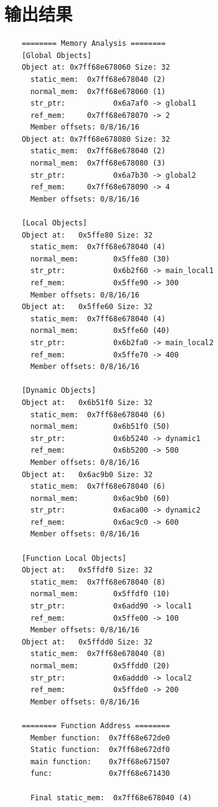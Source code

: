 \documentclass{article}
\begin{document}
\section{输出结果}
\begin{lstlisting}
    ======== Memory Analysis ========
    [Global Objects]
    Object at: 0x7ff68e678060 Size: 32
      static_mem:  0x7ff68e678040 (2)
      normal_mem:  0x7ff68e678060 (1)
      str_ptr:           0x6a7af0 -> global1
      ref_mem:     0x7ff68e678070 -> 2
      Member offsets: 0/8/16/16
    Object at: 0x7ff68e678080 Size: 32
      static_mem:  0x7ff68e678040 (2)
      normal_mem:  0x7ff68e678080 (3)
      str_ptr:           0x6a7b30 -> global2
      ref_mem:     0x7ff68e678090 -> 4
      Member offsets: 0/8/16/16
    
    [Local Objects]
    Object at:   0x5ffe80 Size: 32
      static_mem:  0x7ff68e678040 (4)
      normal_mem:        0x5ffe80 (30)
      str_ptr:           0x6b2f60 -> main_local1
      ref_mem:           0x5ffe90 -> 300
      Member offsets: 0/8/16/16
    Object at:   0x5ffe60 Size: 32
      static_mem:  0x7ff68e678040 (4)
      normal_mem:        0x5ffe60 (40)
      str_ptr:           0x6b2fa0 -> main_local2
      ref_mem:           0x5ffe70 -> 400
      Member offsets: 0/8/16/16
    
    [Dynamic Objects]
    Object at:   0x6b51f0 Size: 32
      static_mem:  0x7ff68e678040 (6)
      normal_mem:        0x6b51f0 (50)
      str_ptr:           0x6b5240 -> dynamic1
      ref_mem:           0x6b5200 -> 500
      Member offsets: 0/8/16/16
    Object at:   0x6ac9b0 Size: 32
      static_mem:  0x7ff68e678040 (6)
      normal_mem:        0x6ac9b0 (60)
      str_ptr:           0x6aca00 -> dynamic2
      ref_mem:           0x6ac9c0 -> 600
      Member offsets: 0/8/16/16
    
    [Function Local Objects]
    Object at:   0x5ffdf0 Size: 32
      static_mem:  0x7ff68e678040 (8)
      normal_mem:        0x5ffdf0 (10)
      str_ptr:           0x6add90 -> local1
      ref_mem:           0x5ffe00 -> 100
      Member offsets: 0/8/16/16
    Object at:   0x5ffdd0 Size: 32
      static_mem:  0x7ff68e678040 (8)
      normal_mem:        0x5ffdd0 (20)
      str_ptr:           0x6addd0 -> local2
      ref_mem:           0x5ffde0 -> 200
      Member offsets: 0/8/16/16
    
    ======== Function Address ========
      Member function:  0x7ff68e672de0
      Static function:  0x7ff68e672df0
      main function:    0x7ff68e671507
      func:             0x7ff68e671430
    
      Final static_mem:  0x7ff68e678040 (4)
\end{lstlisting}
\end{document}
